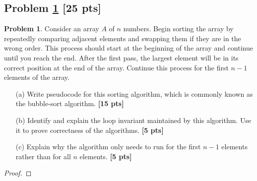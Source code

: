\documentclass[11pt]{article}
\theoremstyle{definition}
\theoremstyle{definition}
\newtheorem{required}{Problem}
\theoremstyle{definition}
\begin{document}
\subsection{Problem \ref{LoopInvariant2} \textbf{[25 pts]}}
\begin{required} \label{LoopInvariant2}
Consider an array \( A \) of \( n \) numbers. Begin sorting the array by repeatedly comparing adjacent elements and swapping them if they are in the wrong order. This process should start at the beginning of the array and continue until you reach the end. After the first pass, the largest element will be in its correct position at the end of the array. Continue this process for the first \( n-1 \) elements of the array.

\begin{enumerate}
    \item[(a)] Write pseudocode for this sorting algorithm, which is commonly known as the bubble-sort algorithm. \textbf{[15 pts]}
    \item[(b)] Identify and explain the loop invariant maintained by this algorithm. Use it to prove correctness of the algorithms. \textbf{[5 pts]}
    \item[(c)] Explain why the algorithm only needs to run for the first \( n-1 \) elements rather than for all \( n \) elements. \textbf{[5 pts]}
\end{enumerate}
\end{required}

\begin{proof}
\end{proof}

\end{document}
